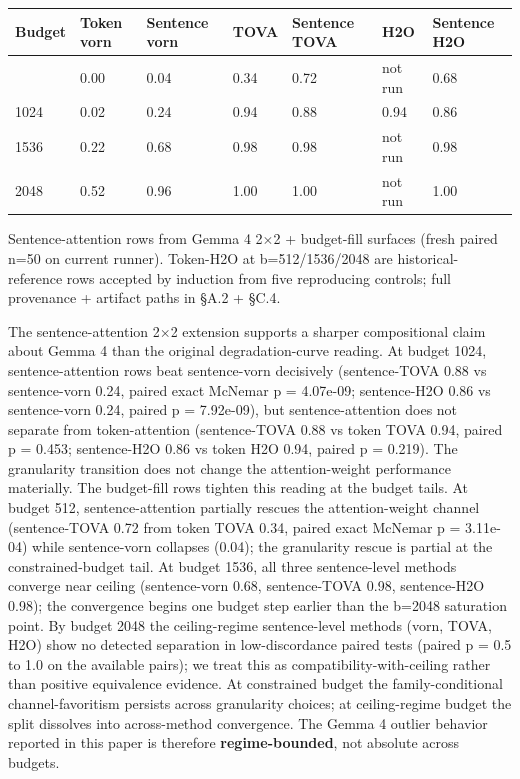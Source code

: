 \documentclass[10pt]{article}
\newcounter{none} %
\begin{document}
{\def\LTcaptype{none} %
{\scriptsize\setlength{\tabcolsep}{2pt}\renewcommand{\arraystretch}{0.92} \begin{longtable}[]{@{}lllllll@{}}
\toprule\noalign{}
Budget & Token vorn & Sentence vorn & TOVA & Sentence TOVA\textdaggerdbl{}
& H2O & Sentence H2O\textdaggerdbl{} \\
\midrule\noalign{}
\endhead
\bottomrule\noalign{}
\endlastfoot
512 & 0.00 & 0.04 & 0.34 & 0.72 & not run & 0.68 \\
1024 & 0.02 & 0.24 & 0.94 & 0.88 & 0.94 & 0.86 \\
1536 & 0.22 & 0.68 & 0.98 & 0.98 & not run & 0.98 \\
2048 & 0.52 & 0.96 & 1.00 & 1.00 & not run & 1.00 \\
\end{longtable}}
}

\textdaggerdbl{} Sentence-attention rows from Gemma 4 2$\times$2 + budget-fill surfaces
(fresh paired n=50 on current runner). Token-H2O at b=512/1536/2048 are
historical-reference rows accepted by induction from five reproducing
controls; full provenance + artifact paths in \S{}A.2 + \S{}C.4.

The sentence-attention 2$\times$2 extension supports a sharper compositional
claim about Gemma 4 than the original degradation-curve reading. At
budget 1024, sentence-attention rows beat sentence-vorn decisively
(sentence-TOVA 0.88 vs sentence-vorn 0.24, paired exact McNemar p
= 4.07e-09; sentence-H2O 0.86 vs sentence-vorn 0.24, paired p =
7.92e-09), but sentence-attention does not separate from token-attention
(sentence-TOVA 0.88 vs token TOVA 0.94, paired p = 0.453;
sentence-H2O 0.86 vs token H2O 0.94, paired p = 0.219). The
granularity transition does not change the attention-weight performance
materially. The budget-fill rows tighten this reading at the
budget tails. At budget 512, sentence-attention partially rescues the
attention-weight channel (sentence-TOVA 0.72 from token TOVA
0.34, paired exact McNemar p = 3.11e-04) while sentence-vorn collapses
(0.04); the granularity rescue is partial at the constrained-budget
tail. At budget 1536, all three sentence-level methods converge near
ceiling (sentence-vorn 0.68, sentence-TOVA 0.98,
sentence-H2O 0.98); the convergence begins one budget step earlier
than the b=2048 saturation point. By budget 2048 the ceiling-regime
sentence-level methods (vorn, TOVA, H2O) show no detected
separation in low-discordance paired tests (paired p = 0.5 to 1.0 on the
available pairs); we treat this as compatibility-with-ceiling rather
than positive equivalence evidence. At constrained budget the
family-conditional channel-favoritism persists across granularity
choices; at ceiling-regime budget the split dissolves into across-method
convergence. The Gemma 4 outlier behavior reported in
this paper is therefore \textbf{regime-bounded}, not absolute across
budgets.
\end{document}
